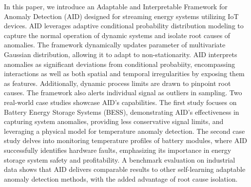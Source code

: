 In this paper, we introduce an Adaptable and Interpretable Framework for Anomaly Detection (AID) designed for streaming energy systems utilizing IoT devices. AID leverages adaptive conditional probability distribution modeling to capture the normal operation of dynamic systems and isolate root causes of anomalies. The framework dynamically updates parameter of multivariate Gaussian distribution, allowing it to adapt to non-stationarity. AID interprets anomalies as significant deviations from conditional probabiity, encompassing interactions as well as both spatial and temporal irregularities by exposing them as features. Additionally, dynamic process limits are drawn to pinpoint root causes. The framework also alerts individual signal as outliers in sampling. Two real-world case studies showcase AID's capabilities. The first study focuses on Battery Energy Storage Systems (BESS), demonstrating AID's effectiveness in capturing system anomalies, providing less conservative signal limits, and leveraging a physical model for temperature anomaly detection. The second case study delves into monitoring temperature profiles of battery modules, where AID successfully identifies hardware faults, emphasizing its importance in energy storage system safety and profitability. A benchmark evaluation on industrial data shows that AID delivers comparable results to other self-learning adaptable anomaly detection methods, with the added advantage of root cause isolation. %
